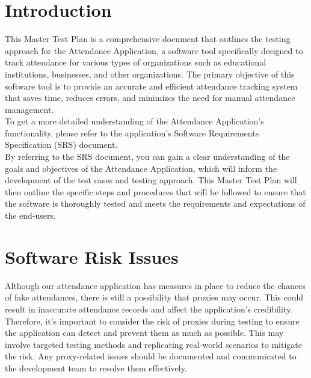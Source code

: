 \documentclass{scrreprt}
\begin{document}
\chapter{Introduction}
This Master Test Plan is a comprehensive document that outlines the testing approach for the Attendance Application, a software tool specifically designed to track attendance for various types of organizations such as educational institutions, businesses, and other organizations. The primary objective of this software tool is to provide an accurate and efficient attendance tracking system that saves time, reduces errors, and minimizes the need for manual attendance management.\\
To get a more detailed understanding of the Attendance Application's functionality, please refer to the application's Software Requirements Specification (SRS) document.\\
By referring to the SRS document, you can gain a clear understanding of the goals and objectives of the Attendance Application, which will inform the development of the test cases and testing approach. This Master Test Plan will then outline the specific steps and procedures that will be followed to ensure that the software is thoroughly tested and meets the requirements and expectations of the end-users.

\chapter{Software Risk Issues}
Although our attendance application has measures in place to reduce the chances of fake attendances, there is still a possibility that proxies may occur. This could result in inaccurate attendance records and affect the application's credibility. Therefore, it's important to consider the risk of proxies during testing to ensure the application can detect and prevent them as much as possible. This may involve targeted testing methods and replicating real-world scenarios to mitigate the risk. Any proxy-related issues should be documented and communicated to the development team to resolve them effectively.
\end{document}
